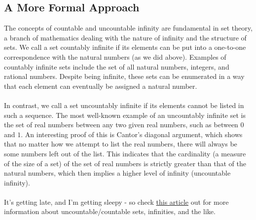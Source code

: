 \subsection{A More Formal Approach}
The concepts of countable and uncountable infinity are fundamental in set theory, a branch of mathematics dealing with the nature of infinity and the structure of sets. 
We call a set countably infinite if its elements can be put into a one-to-one correspondence with the natural numbers (as we did above). 
Examples of countably infinite sets include the set of all natural numbers, integers, and rational numbers. Despite being infinite, these sets can be enumerated in a way that each element can eventually be assigned a natural number.\\
\\
In contrast, we call a set uncountably infinite if its elements cannot be listed in such a sequence. 
The most well-known example of an uncountably infinite set is the set of real numbers between any two given real numbers, such as between $0$ and $1$. 
An interesting proof of this is Cantor’s diagonal argument, which shows that no matter how we attempt to list the real numbers, there will always be some numbers left out of the list. 
This indicates that the cardinality (a measure of the size of a set) of the set of real numbers is strictly greater than that of the natural numbers, which then implies a higher level of infinity (uncountable infinity).\\
\\
It's getting late, and I'm getting sleepy - so check \href{https://math.libretexts.org/Under_Construction/Stalled_Project_(Not_under_Active_Development)/Additional_Discrete_Topics_(Dean)/Infinite_Sets_and_Cardinality#:~:text=An%20infinite%20set%20that%20can,with%20N%20is%20uncountably%20infinite.}{this article} out for more information about uncountable/countable sets, infinities, and the like.
